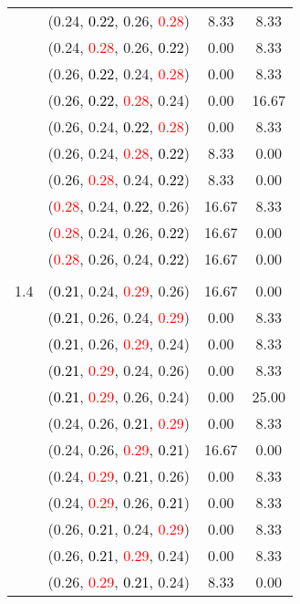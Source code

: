 \documentclass[10pt,a4paper]{report}
\begin{document}
\begin{center}
\begin{longtable}{clcc}
			&(0.24, \textcolor{black}{0.22}, 0.26, \textcolor{red}{0.28})&8.33&8.33\\
			&(0.24, \textcolor{red}{0.28}, 0.26, \textcolor{black}{0.22})&0.00&8.33\\
			&(0.26, \textcolor{black}{0.22}, 0.24, \textcolor{red}{0.28})&0.00&8.33\\
			&(0.26, \textcolor{black}{0.22}, \textcolor{red}{0.28}, 0.24)&0.00&16.67\\
			&(0.26, 0.24, \textcolor{black}{0.22}, \textcolor{red}{0.28})&0.00&8.33\\
			&(0.26, 0.24, \textcolor{red}{0.28}, \textcolor{black}{0.22})&8.33&0.00\\
			&(0.26, \textcolor{red}{0.28}, 0.24, \textcolor{black}{0.22})&8.33&0.00\\
			&(\textcolor{red}{0.28}, 0.24, \textcolor{black}{0.22}, 0.26)&16.67&8.33\\
			&(\textcolor{red}{0.28}, 0.24, 0.26, \textcolor{black}{0.22})&16.67&0.00\\
			&(\textcolor{red}{0.28}, 0.26, 0.24, \textcolor{black}{0.22})&16.67&0.00\\
		&&&\\
		1.4			&(\textcolor{black}{0.21}, 0.24, \textcolor{red}{0.29}, 0.26)&16.67&0.00\\
			&(\textcolor{black}{0.21}, 0.26, 0.24, \textcolor{red}{0.29})&0.00&8.33\\
			&(\textcolor{black}{0.21}, 0.26, \textcolor{red}{0.29}, 0.24)&0.00&8.33\\
			&(\textcolor{black}{0.21}, \textcolor{red}{0.29}, 0.24, 0.26)&0.00&8.33\\
			&(\textcolor{black}{0.21}, \textcolor{red}{0.29}, 0.26, 0.24)&0.00&25.00\\
			&(0.24, 0.26, \textcolor{black}{0.21}, \textcolor{red}{0.29})&0.00&8.33\\
			&(0.24, 0.26, \textcolor{red}{0.29}, \textcolor{black}{0.21})&16.67&0.00\\
			&(0.24, \textcolor{red}{0.29}, \textcolor{black}{0.21}, 0.26)&0.00&8.33\\
			&(0.24, \textcolor{red}{0.29}, 0.26, \textcolor{black}{0.21})&0.00&8.33\\
			&(0.26, \textcolor{black}{0.21}, 0.24, \textcolor{red}{0.29})&0.00&8.33\\
			&(0.26, \textcolor{black}{0.21}, \textcolor{red}{0.29}, 0.24)&0.00&8.33\\
			&(0.26, \textcolor{red}{0.29}, \textcolor{black}{0.21}, 0.24)&8.33&0.00\\

\end{longtable}
\end{center}
\end{document}
